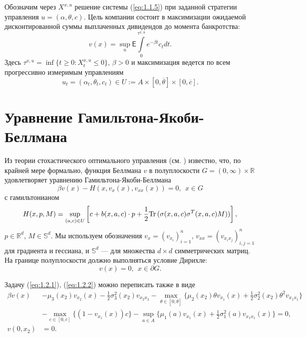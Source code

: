 Обозначим через $X^{x,u}$ решение системы (\ref{eq:1.1.5}) при заданной стратегии управления $u=(\alpha,\theta,c)$. Цель компании состоит в максимизации ожидаемой дисконтированной суммы выплаченных дивидендов до момента банкротства:
\begin{equation} \label{eq:1.1.6}
v(x)=\sup_{u}\mathsf E \int\limits_{0}^{\tau^{x,u}} e^{-\beta t} c_t dt.
\end{equation}
Здесь $\tau^{x,u}=\inf\{t\ge 0: X_t^{x,u}\le 0\}$, $\beta>0$ и максимизация ведется по всем прогрессивно измеримым управлениям
$$ u_t=(\alpha_t,\theta_t,c_t)\in U:=A\times [0,\overline\theta]\times [0,\overline c].$$

\section{Уравнение Гамильтона-Якоби-Беллмана} \label{sect:1.2}
Из теории стохастического оптимального управления (см. \cite{Kry77, Pha09, Tou13}) известно, что, по крайней мере формально, функция Беллмана $v$ в полуплоскости $G=(0,\infty)\times \mathbb R$ удовлетворяет уравнению Гамильтона-Якоби-Беллмана
\begin{equation} \label{eq:1.2.1}
\beta v(x) - H(x,v_x(x),v_{xx}(x))=0,\ \  x\in G
\end{equation}
с гамильтонианом
$$ H(x,p,M)=\sup_{(a,c)\in U} \left[c+b(x,a,c)\cdot p + \frac{1}{2}{\rm Tr\,}(\sigma(x,a,c)\sigma^T(x,a,c)M))\right],$$
$p\in\mathbb R^d$, $M\in\mathbb S^d$. Мы используем обозначения $v_x=(v_{x_i})_{i=1}^n$, $v_{xx}=(v_{x_i x_j})_{i,j=1}^n$ для градиента и гессиана, и $\mathbb S^d$ --- для множества $d\times d$ симметрических матриц. На границе полуплоскости должно выполняться условие Дирихле:
\begin{equation} \label{eq:1.2.2}
v(x)=0,\ \ x\in\partial G.
\end{equation}

Задачу (\ref{eq:1.2.1}), (\ref{eq:1.2.2}) можно переписать также в виде
\begin{align} \label{eq:1.2.1A}
 \beta v(x) &-\mu_3(x_2) v_{x_2}(x)-\frac{1}{2}\sigma_3^2(x_2) v_{x_2 x_2}-\max_{\theta\in [0,\overline\theta]}\{\mu_2(x_2)\theta v_{x_1}(x)+\frac{1}{2}\sigma_2^2(x_2)\theta^2 v_{x_1 x_1}\}\nonumber\\
&- \max_{c\in [0,\overline c]}\{(1-v_{x_1}(x))c\}-\sup_{a\in A}\{\mu_1(a)v_{x_1}(x)+\frac{1}{2}\sigma_1^2(a)v_{x_1 x_1}(x)\}=0,\\
v(0,x_2) &=0.\nonumber
\end{align}

